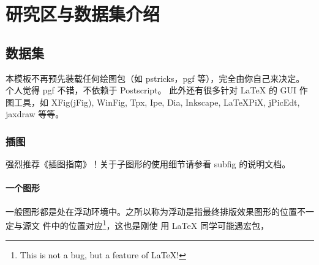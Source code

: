 
\chapter{研究区与数据集介绍}
\label{cha:chap02}

\section{数据集}
\label{sec:other}


本模板不再预先装载任何绘图包（如 \textsf{pstricks，pgf} 等），完全由你自己来决定。
个人觉得 \textsf{pgf} 不错，不依赖于 Postscript。 此外还有很多针对 \LaTeX{} 的
GUI 作图工具，如 XFig(jFig), WinFig, Tpx, Ipe, Dia, Inkscape, LaTeXPiX,
jPicEdt, jaxdraw 等等。

\subsection{插图}
\label{sec:graphs}

强烈推荐《\LaTeXe 插图指南》！关于子图形的使用细节请参看 \textsf{subfig} 的说明文档。

\subsubsection{一个图形}
\label{sec:onefig}
一般图形都是处在浮动环境中。之所以称为浮动是指最终排版效果图形的位置不一定与源文
件中的位置对应\footnote{This is not a bug, but a feature of \LaTeX!}，这也是刚使
用 \LaTeX{} 同学可能遇宏包，



